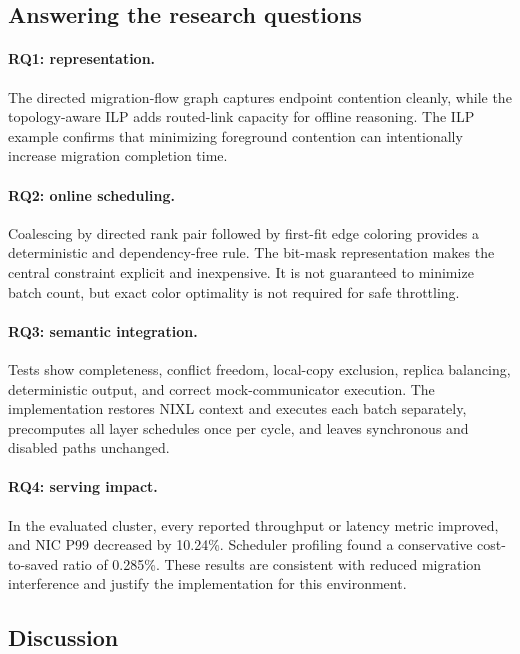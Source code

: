 \subsection{Answering the research questions}

\paragraph{RQ1: representation.}
The directed migration-flow graph captures endpoint contention cleanly, while
the topology-aware ILP adds routed-link capacity for offline reasoning. The ILP
example confirms that minimizing foreground contention can intentionally
increase migration completion time.

\paragraph{RQ2: online scheduling.}
Coalescing by directed rank pair followed by first-fit edge coloring provides a
deterministic and dependency-free rule. The bit-mask representation makes the
central constraint explicit and inexpensive. It is not guaranteed to minimize
batch count, but exact color optimality is not required for safe throttling.

\paragraph{RQ3: semantic integration.}
Tests show completeness, conflict freedom, local-copy exclusion, replica
balancing, deterministic output, and correct mock-communicator execution. The
implementation restores NIXL context and executes each batch separately,
precomputes all layer schedules once per cycle, and leaves synchronous and
disabled paths unchanged.

\paragraph{RQ4: serving impact.}
In the evaluated cluster, every reported throughput or latency metric improved,
and NIC P99 decreased by 10.24\%. Scheduler profiling found a conservative
cost-to-saved ratio of 0.285\%. These results are consistent with reduced
migration interference and justify the implementation for this environment.

\subsection{Discussion}

